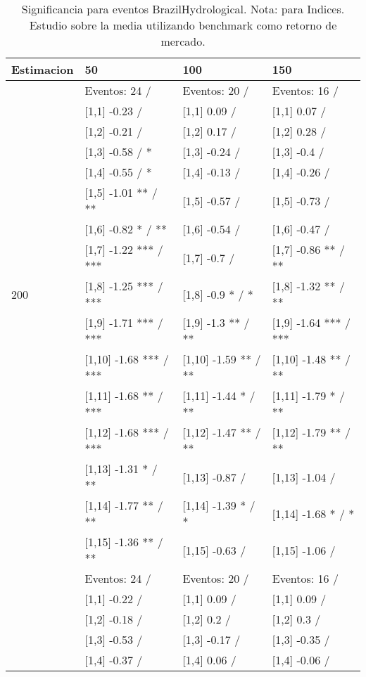 \begin{table}

\caption{Significancia para eventos BrazilHydrological. Nota: para Indices. Estudio sobre la media utilizando benchmark como retorno de mercado.}
\centering
\begin{tabular}[t]{llll}
\toprule
Estimacion & 50 & 100 & 150\\
\midrule
 & Eventos:  24 / & Eventos:  20 / & Eventos:  16 /\\
 & {}[1,1] -0.23  / & {}[1,1] 0.09  / & {}[1,1] 0.07  /\\
 & {}[1,2] -0.21  / & {}[1,2] 0.17  / & {}[1,2] 0.28  /\\
 & {}[1,3] -0.58  / * & {}[1,3] -0.24  / & {}[1,3] -0.4  /\\
 & {}[1,4] -0.55  / * & {}[1,4] -0.13  / & {}[1,4] -0.26  /\\
\addlinespace
 & {}[1,5] -1.01 ** / ** & {}[1,5] -0.57  / & {}[1,5] -0.73  /\\
 & {}[1,6] -0.82 * / ** & {}[1,6] -0.54  / & {}[1,6] -0.47  /\\
 & {}[1,7] -1.22 *** / *** & {}[1,7] -0.7  / & {}[1,7] -0.86 ** / **\\
200 & {}[1,8] -1.25 *** / *** & {}[1,8] -0.9 * / * & {}[1,8] -1.32 ** / **\\
 & {}[1,9] -1.71 *** / *** & {}[1,9] -1.3 ** / ** & {}[1,9] -1.64 *** / ***\\
\addlinespace
 & {}[1,10] -1.68 *** / *** & {}[1,10] -1.59 ** / ** & {}[1,10] -1.48 ** / **\\
 & {}[1,11] -1.68 ** / *** & {}[1,11] -1.44 * / ** & {}[1,11] -1.79 * / **\\
 & {}[1,12] -1.68 *** / *** & {}[1,12] -1.47 ** / ** & {}[1,12] -1.79 ** / **\\
 & {}[1,13] -1.31 * / ** & {}[1,13] -0.87  / & {}[1,13] -1.04  /\\
 & {}[1,14] -1.77 ** / ** & {}[1,14] -1.39 * / * & {}[1,14] -1.68 * / *\\
\addlinespace
 & {}[1,15] -1.36 ** / ** & {}[1,15] -0.63  / & {}[1,15] -1.06  /\\
 & Eventos:  24 / & Eventos:  20 / & Eventos:  16 /\\
 & {}[1,1] -0.22  / & {}[1,1] 0.09  / & {}[1,1] 0.09  /\\
 & {}[1,2] -0.18  / & {}[1,2] 0.2  / & {}[1,2] 0.3  /\\
 & {}[1,3] -0.53  / & {}[1,3] -0.17  / & {}[1,3] -0.35  /\\
\addlinespace
 & {}[1,4] -0.37  / & {}[1,4] 0.06  / & {}[1,4] -0.06  /\\

\end{tabular}
\end{table}
